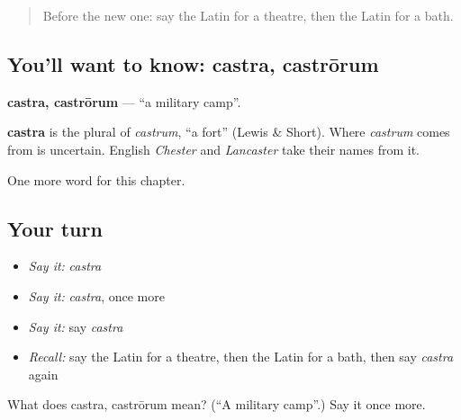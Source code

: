 \label{lesson:LA-C115-castra}



\begin{quote}
Before the new one: say the Latin for a theatre, then the Latin for a bath.
\end{quote}

\subsection*{You'll want to know: castra, castrōrum}
\textbf{castra, castrōrum} — \textquotedblleft{}a military camp\textquotedblright{}.

\begin{cousinweb}
\textbf{castra} is the plural of \emph{castrum}, \textquotedblleft{}a fort\textquotedblright{} (Lewis \& Short). Where \emph{castrum} comes from is uncertain. English \emph{Chester} and \emph{Lancaster} take their names from it.
\end{cousinweb}

\begin{grammarlens}[title={What you've built}]
One more word for this chapter.
\end{grammarlens}

\subsection*{Your turn}
\begin{itemize}
\raggedright
  \item \emph{Say it:} \emph{castra}
  \item \emph{Say it:} \emph{castra}, once more
  \item \emph{Say it:} say \emph{castra}
  \item \emph{Recall:} say the Latin for a theatre, then the Latin for a bath, then say \emph{castra} again
\end{itemize}

\begin{tcolorbox}[breakable,colback=teal!4,colframe=teal!35!black,title={Before you move on}]
What does castra, castrōrum mean? (\textquotedblleft{}A military camp\textquotedblright{}.) Say it once more.
\end{tcolorbox}
